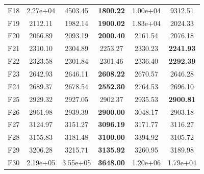 \documentclass[a4paper,fleqn]{cas-sc}
\begin{document}
\begin{table}[t]
{\begin{tabular}{lccccc}
F18 & 2.27e+04 & 4503.45 & \textbf{1800.22} & 1.00e+04 & 9312.51 \\
F19 & 2112.11 & 1982.14 & \textbf{1900.02} & 1.83e+04 & 2024.33 \\
F20 & 2066.89 & 2093.19 & \textbf{2000.40} & 2161.54 & 2076.18 \\
F21 & 2310.10 & 2304.89 & 2253.27 & 2330.23 & \textbf{2241.93} \\
F22 & 2323.58 & 2301.84 & 2301.46 & 2336.40 & \textbf{2292.39} \\
F23 & 2642.93 & 2646.11 & \textbf{2608.22} & 2670.57 & 2646.28 \\
F24 & 2689.37 & 2678.54 & \textbf{2552.30} & 2764.53 & 2696.10 \\
F25 & 2929.32 & 2927.05 & 2902.37 & 2935.53 & \textbf{2900.81} \\
F26 & 2961.98 & 2939.39 & \textbf{2900.00} & 3048.17 & 2903.18 \\
F27 & 3124.97 & 3151.27 & \textbf{3096.19} & 3171.77 & 3116.27 \\
F28 & 3155.83 & 3181.48 & \textbf{3100.00} & 3394.92 & 3105.72 \\
F29 & 3206.28 & 3215.71 & \textbf{3135.92} & 3260.95 & 3189.98 \\
F30 & 2.19e+05 & 3.55e+05 & \textbf{3648.00} & 1.20e+06 & 1.79e+04 \\
\bottomrule
\end{tabular}}
\end{table}
\end{document}
